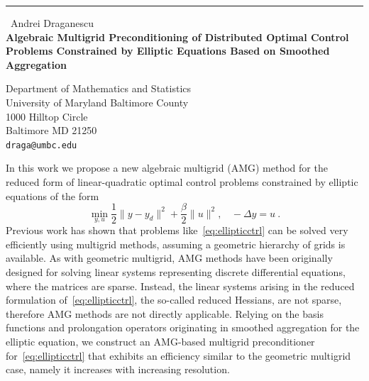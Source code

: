 \documentclass{report}
\begin{document}
\begin{center}
\rule{6in}{1pt} \
{\large Andrei Draganescu \\
{\bf Algebraic Multigrid Preconditioning of Distributed Optimal Control Problems Constrained by Elliptic Equations Based on Smoothed Aggregation}}

Department of Mathematics and Statistics \\ University of Maryland Baltimore County \\ 1000 Hilltop Circle \\ Baltimore MD 21250
\\
{\tt draga@umbc.edu}\end{center}

In this work we propose a new algebraic multigrid (AMG) method for the
reduced form of linear-quadratic optimal control problems constrained by
elliptic equations of the form
\begin{equation}
\label{eq:ellipticctrl}
\min_{y,u} \frac{1}{2}\| y-y_d\| ^2+\frac{\beta}{2}\|u\|^2,\ \ \ \ -\Delta y=u\ .
\end{equation}
Previous work has shown that problems like~\eqref{eq:ellipticctrl} can be
solved very efficiently using multigrid methods, assuming a geometric
hierarchy of grids is available. As with geometric multigrid, AMG methods
have been originally designed for solving linear systems representing
discrete differential equations, where the matrices are sparse. Instead,
the linear systems arising in the reduced formulation
of~\eqref{eq:ellipticctrl}, the so-called reduced Hessians, are not
sparse, therefore AMG methods are not directly applicable. Relying on the
basis functions and prolongation operators originating in smoothed
aggregation for the elliptic equation, we construct an AMG-based
multigrid preconditioner for~\eqref{eq:ellipticctrl} that exhibits an
efficiency similar to the geometric multigrid case, namely it increases
with increasing resolution.
\end{document}
